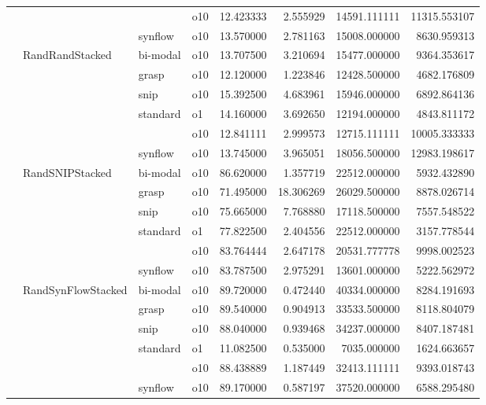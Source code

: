 \begin{longtable}{llllrrrr}
      &     &         & o10 &  12.423333 &   2.555929 &     14591.111111 &  11315.553107 \\
      &     & synflow & o10 &  13.570000 &   2.781163 &     15008.000000 &   8630.959313 \\
      & RandRandStacked & bi-modal & o10 &  13.707500 &   3.210694 &     15477.000000 &   9364.353617 \\
      &     & grasp & o10 &  12.120000 &   1.223846 &     12428.500000 &   4682.176809 \\
      &     & snip & o10 &  15.392500 &   4.683961 &     15946.000000 &   6892.864136 \\
      &     & standard & o1 &  14.160000 &   3.692650 &     12194.000000 &   4843.811172 \\
      &     &         & o10 &  12.841111 &   2.999573 &     12715.111111 &  10005.333333 \\
      &     & synflow & o10 &  13.745000 &   3.965051 &     18056.500000 &  12983.198617 \\
      & RandSNIPStacked & bi-modal & o10 &  86.620000 &   1.357719 &     22512.000000 &   5932.432890 \\
      &     & grasp & o10 &  71.495000 &  18.306269 &     26029.500000 &   8878.026714 \\
      &     & snip & o10 &  75.665000 &   7.768880 &     17118.500000 &   7557.548522 \\
      &     & standard & o1 &  77.822500 &   2.404556 &     22512.000000 &   3157.778544 \\
      &     &         & o10 &  83.764444 &   2.647178 &     20531.777778 &   9998.002523 \\
      &     & synflow & o10 &  83.787500 &   2.975291 &     13601.000000 &   5222.562972 \\
      & RandSynFlowStacked & bi-modal & o10 &  89.720000 &   0.472440 &     40334.000000 &   8284.191693 \\
      &     & grasp & o10 &  89.540000 &   0.904913 &     33533.500000 &   8118.804079 \\
      &     & snip & o10 &  88.040000 &   0.939468 &     34237.000000 &   8407.187481 \\
      &     & standard & o1 &  11.082500 &   0.535000 &      7035.000000 &   1624.663657 \\
      &     &         & o10 &  88.438889 &   1.187449 &     32413.111111 &   9393.018743 \\
      &     & synflow & o10 &  89.170000 &   0.587197 &     37520.000000 &   6588.295480 \\

\end{longtable}
